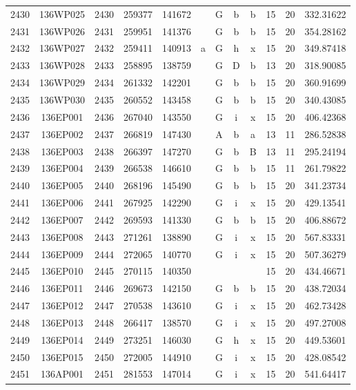 \begin{tabular}{|*{12}{c|}}
2430 & 136WP025 & 2430 & 259377 & 141672 &  & G & b & b & 15 & 20 & 332.31622 \\ 
2431 & 136WP026 & 2431 & 259951 & 141376 &  & G & b & b & 15 & 20 & 354.28162 \\ 
2432 & 136WP027 & 2432 & 259411 & 140913 & a & G & h & x & 15 & 20 & 349.87418 \\ 
2433 & 136WP028 & 2433 & 258895 & 138759 &  & G & D & b & 13 & 20 & 318.90085 \\ 
2434 & 136WP029 & 2434 & 261332 & 142201 &  & G & b & b & 15 & 20 & 360.91699 \\ 
2435 & 136WP030 & 2435 & 260552 & 143458 &  & G & b & b & 15 & 20 & 340.43085 \\ 
2436 & 136EP001 & 2436 & 267040 & 143550 &  & G & i & x & 15 & 20 & 406.42368 \\ 
2437 & 136EP002 & 2437 & 266819 & 147430 &  & A & b & a & 13 & 11 & 286.52838 \\ 
2438 & 136EP003 & 2438 & 266397 & 147270 &  & G & b & B & 13 & 11 & 295.24194 \\ 
2439 & 136EP004 & 2439 & 266538 & 146610 &  & G & b & b & 15 & 11 & 261.79822 \\ 
2440 & 136EP005 & 2440 & 268196 & 145490 &  & G & b & b & 15 & 20 & 341.23734 \\ 
2441 & 136EP006 & 2441 & 267925 & 142290 &  & G & i & x & 15 & 20 & 429.13541 \\ 
2442 & 136EP007 & 2442 & 269593 & 141330 &  & G & b & b & 15 & 20 & 406.88672 \\ 
2443 & 136EP008 & 2443 & 271261 & 138890 &  & G & i & x & 15 & 20 & 567.83331 \\ 
2444 & 136EP009 & 2444 & 272065 & 140770 &  & G & i & x & 15 & 20 & 507.36279 \\ 
2445 & 136EP010 & 2445 & 270115 & 140350 &  &  &  &  & 15 & 20 & 434.46671 \\ 
2446 & 136EP011 & 2446 & 269673 & 142150 &  & G & b & b & 15 & 20 & 438.72034 \\ 
2447 & 136EP012 & 2447 & 270538 & 143610 &  & G & i & x & 15 & 20 & 462.73428 \\ 
2448 & 136EP013 & 2448 & 266417 & 138570 &  & G & i & x & 15 & 20 & 497.27008 \\ 
2449 & 136EP014 & 2449 & 273251 & 146030 &  & G & h & x & 15 & 20 & 449.53601 \\ 
2450 & 136EP015 & 2450 & 272005 & 144910 &  & G & i & x & 15 & 20 & 428.08542 \\ 
2451 & 136AP001 & 2451 & 281553 & 147014 &  & G & i & x & 15 & 20 & 541.64417 \\ 

\end{tabular}
